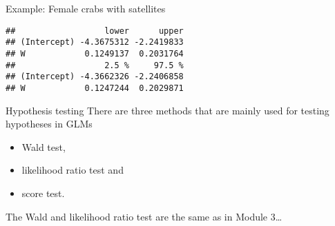 \documentclass[
  ignorenonframetext,
]{beamer}
\newenvironment{Shaded}{\begin{snugshade}}{\end{snugshade}}
\newcommand{\AttributeTok}[1]{\textcolor[rgb]{0.13,0.29,0.53}{#1}}
\newcommand{\CommentTok}[1]{\textcolor[rgb]{0.56,0.35,0.01}{\textit{#1}}}
\newcommand{\FloatTok}[1]{\textcolor[rgb]{0.00,0.00,0.81}{#1}}
\newcommand{\FunctionTok}[1]{\textcolor[rgb]{0.13,0.29,0.53}{\textbf{#1}}}
\newcommand{\NormalTok}[1]{#1}
\newcommand{\OtherTok}[1]{\textcolor[rgb]{0.56,0.35,0.01}{#1}}
\newcommand{\SpecialCharTok}[1]{\textcolor[rgb]{0.81,0.36,0.00}{\textbf{#1}}}
\providecommand{\tightlist}{%
  \setlength{\itemsep}{0pt}\setlength{\parskip}{0pt}}
\begin{document}
\begin{frame}[fragile]
\begin{block}{Example: Female crabs with satellites}
\label{example-female-crabs-with-satellites}
\begin{Shaded}
\end{Shaded}

\begin{verbatim}
##                  lower      upper
## (Intercept) -4.3675312 -2.2419833
## W            0.1249137  0.2031764
##                  2.5 %     97.5 %
## (Intercept) -4.3662326 -2.2406858
## W            0.1247244  0.2029871
\end{verbatim}
\end{block}
\end{frame}

\begin{frame}
\begin{block}{Hypothesis testing}
\label{hypothesis-testing}
There are three methods that are mainly used for testing hypotheses in
GLMs

\begin{itemize}
\tightlist
\item
  Wald test,
\item
  likelihood ratio test and
\item
  score test.
\end{itemize}

The Wald and likelihood ratio test are the same as in Module 3\ldots{}
\end{block}
\end{frame}
\end{document}
